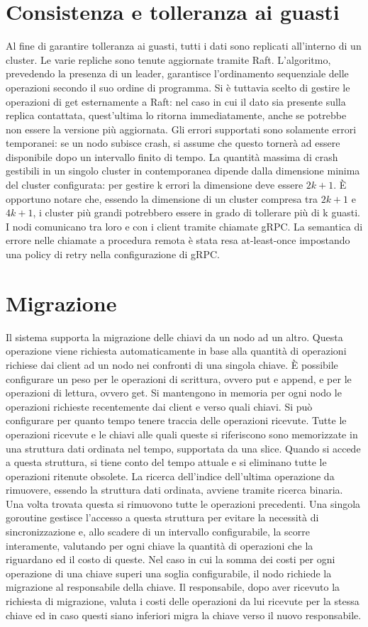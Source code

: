 \documentclass[conference]{IEEEtran}
\begin{document}
\section{Consistenza e tolleranza ai guasti}
Al fine di garantire tolleranza ai guasti, tutti i dati sono replicati all'interno di un cluster. Le varie repliche sono tenute aggiornate
tramite Raft. L'algoritmo, prevedendo la presenza di un leader, garantisce l'ordinamento sequenziale delle operazioni
secondo il suo ordine di programma. Si è tuttavia scelto di gestire le operazioni di get esternamente a Raft: nel caso
in cui il dato sia presente sulla replica contattata, quest'ultima lo ritorna immediatamente, anche se potrebbe non essere
la versione più aggiornata. Gli errori supportati sono solamente errori temporanei: se un nodo subisce crash, si assume
che questo tornerà ad essere disponibile dopo un intervallo finito di tempo. La quantità massima di crash gestibili
in un singolo cluster in contemporanea dipende dalla dimensione minima del cluster configurata: per gestire k errori la
dimensione deve essere \(2k+1\). È opportuno notare che, essendo la dimensione di un cluster compresa tra \(2k+1\) e
\(4k+1\), i cluster più grandi potrebbero essere in grado di tollerare più di k guasti. I nodi comunicano tra loro e con
i client tramite chiamate gRPC. La semantica di errore nelle chiamate a procedura remota è stata resa at-least-once impostando
una policy di retry nella configurazione di gRPC.

\section{Migrazione}
Il sistema supporta la migrazione delle chiavi da un nodo ad un altro. Questa operazione viene richiesta automaticamente
in base alla quantità di operazioni richiese dai client ad un nodo nei confronti di una singola chiave. È possibile configurare
un peso per le operazioni di scrittura, ovvero put e append, e per le operazioni di lettura, ovvero get. Si mantengono
in memoria per ogni nodo le operazioni richieste recentemente dai client e verso quali chiavi.
Si può configurare per quanto tempo tenere traccia delle operazioni ricevute. Tutte le operazioni ricevute e le chiavi
alle quali queste si riferiscono sono memorizzate in una struttura dati ordinata nel tempo, supportata da una slice.
Quando si accede a questa struttura, si tiene conto del tempo attuale e si eliminano tutte le operazioni ritenute obsolete.
La ricerca dell'indice dell'ultima operazione da rimuovere, essendo la struttura dati ordinata, avviene tramite ricerca
binaria. Una volta trovata questa si rimuovono tutte le operazioni precedenti. Una singola goroutine gestisce l'accesso a questa
struttura per evitare la necessità di sincronizzazione e, allo scadere di un intervallo configurabile, la scorre interamente,
valutando per ogni chiave la quantità di operazioni che la riguardano ed il costo di queste. Nel caso in cui la somma dei
costi per ogni operazione di una chiave superi una soglia configurabile, il nodo richiede la migrazione al responsabile della chiave.
Il responsabile, dopo aver ricevuto la richiesta di migrazione, valuta i costi delle operazioni da lui ricevute per la stessa
chiave ed in caso questi siano inferiori migra la chiave verso il nuovo responsabile.
\end{document}

